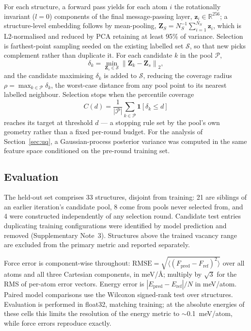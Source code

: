 \documentclass[11pt]{article}
\begin{document}
For each structure, a forward pass yields for each atom $i$ the rotationally
invariant ($l=0$) components of the final message-passing layer,
$\mathbf{z}_i\in\mathbb{R}^{256}$; a structure-level embedding follows by
mean-pooling, $\mathbf{Z}_S = N_S^{-1}\sum_{i=1}^{N_S}\mathbf{z}_i$, which is
L2-normalised and reduced by PCA retaining at least 95\% of variance. Selection
is farthest-point sampling seeded on the existing labelled set $\mathcal{S}$, so
that new picks complement rather than duplicate it. For each candidate $k$ in
the pool $\mathcal{P}$,
\begin{equation}
\delta_k = \min_{\mathbf{Z}_s\in\mathcal{S}}\left\|\mathbf{Z}_k-\mathbf{Z}_s\right\|_2 ,
\end{equation}
and the candidate maximising $\delta_k$ is added to $\mathcal{S}$, reducing the
coverage radius $\rho=\max_{k\in\mathcal{P}}\delta_k$, the worst-case distance
from any pool point to its nearest labelled neighbour. Selection stops when the
percentile coverage
\begin{equation}
C(d) = \frac{1}{|\mathcal{P}|}\sum_{k\in\mathcal{P}}
\mathbf{1}\!\left[\delta_k\leq d\right]
\end{equation}
reaches its target at threshold $d$ --- a stopping rule set by the pool's own
geometry rather than a fixed per-round budget. For the analysis of
Section~\ref{sec:uq}, a Gaussian-process posterior variance was computed in the
same feature space conditioned on the pre-round training set.

\subsection{Evaluation}
The held-out set comprises 33 structures, disjoint from training: 21 are
siblings of an earlier iteration's candidate pool, 8 come from pools never
selected from, and 4 were constructed independently of any selection round.
Candidate test entries duplicating training configurations were identified by
model prediction and removed (Supplementary Note~3). Structures above the trained
vacancy range are excluded from the primary metric and reported separately.

Force error is component-wise throughout:
$\mathrm{RMSE}=\sqrt{\langle(F_{\mathrm{pred}}-F_{\mathrm{ref}})^2\rangle}$ over
all atoms and all three Cartesian components, in meV/\AA; multiply by $\sqrt{3}$
for the RMS of per-atom error vectors. Energy error is
$|E_{\mathrm{pred}}-E_{\mathrm{ref}}|/N$ in meV/atom. Paired model comparisons use
the Wilcoxon signed-rank test over structures. Evaluation is performed in
float32, matching training; at the absolute energies of these cells this limits
the resolution of the energy metric to $\sim$0.1~meV/atom, while force errors
reproduce exactly.
\end{document}
